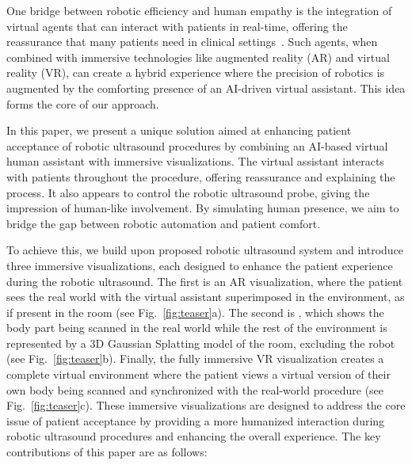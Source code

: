 One  bridge between robotic efficiency and human empathy is the integration of virtual agents that can interact with patients in real-time, offering the reassurance that many patients need in clinical settings~\cite{lisetti2015now}.  Such agents, when combined with immersive technologies like augmented reality (AR) and virtual reality (VR), can create a hybrid experience where the precision of robotics is augmented by the comforting presence of an AI-driven virtual assistant. This idea forms the core of our approach.

In this paper, we present a unique solution aimed at enhancing patient acceptance of robotic ultrasound procedures by combining an AI-based virtual human assistant with immersive visualizations. The virtual assistant interacts with patients throughout the procedure, offering reassurance and explaining the process. It also appears to control the robotic ultrasound probe, giving the impression of human-like involvement. By simulating human presence, we aim to bridge the gap between robotic automation and patient comfort.

To achieve this, we build upon proposed robotic ultrasound system and introduce three immersive visualizations, each designed to enhance the patient experience during the robotic ultrasound. The first is an AR visualization, where the patient sees the real world with the virtual assistant superimposed in the environment, as if present in the room (see Fig.~\ref{fig:teaser}a). The second is , which shows the body part being scanned in the real world while the rest of the environment is represented by a 3D Gaussian Splatting model of the room, excluding the robot (see Fig.~\ref{fig:teaser}b). Finally, the fully immersive VR visualization creates a complete virtual environment where the patient views a virtual version of their own body being scanned and synchronized with the real-world procedure (see Fig.~\ref{fig:teaser}c).
These immersive visualizations are designed to address the core issue of patient acceptance by providing a more humanized interaction during robotic ultrasound procedures and enhancing the overall experience.
The key contributions of this paper are as follows:

